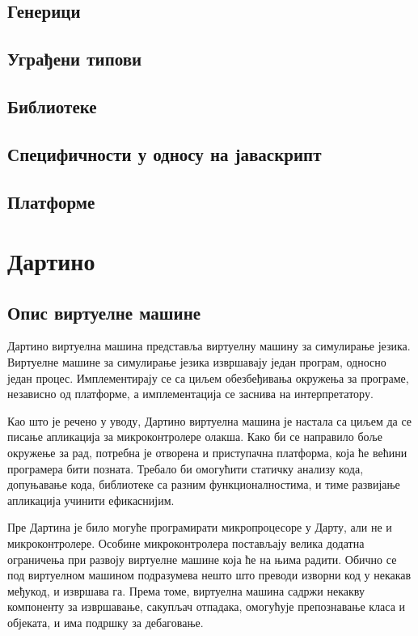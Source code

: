 \documentclass[12pt,oneside]{memoir}
\begin{document}
\section{Генерици}

\section{Уграђени типови}

\section{Библиотеке}

\section{Специфичности у односу на јаваскрипт}

\section{Платформе}


\chapter{Дартино}
\label{chp:dartino}
\section{Опис виртуелне машине}

Дартино виртуелна машина представља виртуелну машину за симулирање језика. Виртуелне машине за симулирање језика извршавају један програм, односно један процес. Имплементирају се са циљем обезбеђивања окружења за програме, независно од платформе, а имплементација се заснива на интерпретатору.

Као што је речено у уводу, Дартино виртуелна машина је настала са циљем да се писање апликација за микроконтролере олакша. Како би се направило боље окружење за рад, потребна је отворена и приступачна платформа, која ће већини програмера бити позната. Требало би омогућити статичку анализу кода, допуњавање кода, библиотеке са разним функционалностима, и тиме развијање апликација учинити ефикаснијим.

Пре Дартина је било могуће програмирати микропроцесоре у Дарту, али не и микроконтролере. Особине микроконтролера постављају велика додатна ограничења при развоју виртуелне машине која ће на њима радити. Обично се под виртуелном машином подразумева нешто што преводи изворни код у некакав међукод, и извршава га. Према томе, виртуелна машина садржи некакву компоненту за извршавање, сакупљач отпадака, омогућује препознавање класа и објеката, и има подршку за дебаговање.
\end{document}
